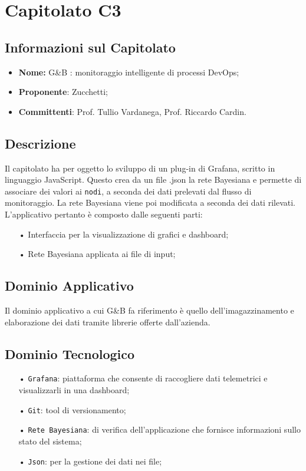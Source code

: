 \section{Capitolato C3}

\subsection{Informazioni sul Capitolato}

\begin{itemize}
	\item \textbf{Nome:} G\&{B} : monitoraggio intelligente di processi DevOps;
	\item \textbf{Proponente}: Zucchetti;
	\item \textbf{Committenti}: Prof. Tullio Vardanega, Prof. Riccardo Cardin.
\end{itemize}

\subsection{Descrizione}
Il capitolato ha per oggetto lo sviluppo di un plug-in di Grafana, scritto in linguaggio JavaScript. Questo crea da un file .json la rete Bayesiana e permette di associare dei valori ai \texttt{nodi}, a seconda dei dati prelevati dal flusso di monitoraggio.
La rete Bayesiana viene poi modificata a seconda dei dati rilevati. 
L'applicativo pertanto è composto dalle seguenti parti: 

\begin{itemize}

\item[•] Interfaccia per la visualizzazione di grafici e dashboard;
\item[•] Rete Bayesiana applicata ai file di input;

\end{itemize}

\subsection{Dominio Applicativo}
Il dominio applicativo a cui G\&{B} fa riferimento è quello dell'imagazzinamento e elaborazione dei dati tramite librerie offerte dall'azienda. 

\subsection{Dominio Tecnologico}
\begin{itemize}

\item[•] \texttt{Grafana}: piattaforma che consente di raccogliere dati telemetrici e visualizzarli in una dashboard;
\item[•] \texttt{Git}: tool di versionamento;
\item[•] \texttt{Rete Bayesiana}: di verifica dell'applicazione che fornisce informazioni sullo stato del sistema;
\item[•] \texttt{Json}: per la gestione dei dati nei file;

\end{itemize}


